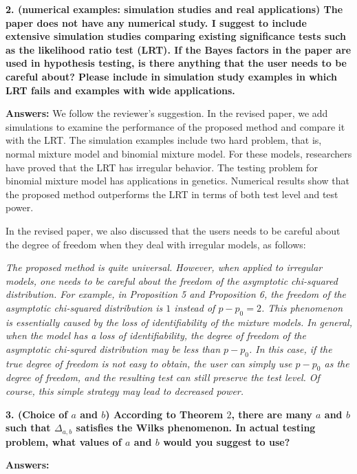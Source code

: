 \documentclass[11pt]{article}
\theoremstyle{plain}
\theoremstyle{definition}
\theoremstyle{remark}
\begin{document}
\textbf{
    2.
    (numerical examples: simulation studies and real applications) The paper does not have any numerical study. I suggest to include extensive simulation studies comparing existing significance tests such as the likelihood ratio test (LRT). If the Bayes factors in the paper are used in hypothesis testing, is there anything that the user needs to be careful about? Please include in simulation study examples in which LRT fails and examples with wide applications.
}

\textbf{Answers:}
We follow the reviewer's suggestion.
In the revised paper, we add simulations to examine the performance of the proposed method and compare it with the LRT.
The simulation examples include two hard problem, that is, normal mixture model and binomial mixture model.
For these models, researchers have proved that the LRT has irregular behavior.
The testing problem for binomial mixture model has applications in genetics.
Numerical results show that the proposed method outperforms the LRT in terms of both test level and test power.

In the revised paper, we also discussed that the users needs to be careful about the degree of freedom when they deal with irregular models, as follows:

\begin{adjustwidth}{1.5em}{1.5em}
    \emph{
The proposed method is quite universal. 
However, when applied to irregular models, one needs to be careful about the freedom of the asymptotic chi-squared distribution.
For example, in Proposition 5 and Proposition 6, the freedom of the asymptotic chi-squared distribution is $1$ instead of $p-p_0 = 2$.
This phenomenon is essentially caused by the loss of identifiability of the mixture models.
In general, when the model has a loss of identifiability, the degree of freedom of the asymptotic chi-squred distribution may be less than $p-p_0$.
In this case, if the true degree of freedom is not easy to obtain, the user can simply use $p-p_0$ as the degree of freedom, and the resulting test can still preserve the test level.
Of course, this simple strategy may lead to decreased power.
}
\end{adjustwidth}


\textbf{
    3. (Choice of $a$ and $b$) According to Theorem $2$, there are many $a$ and $b$ such that $\Delta_{a,b}$ satisfies the Wilks phenomenon.
    In actual testing problem, what values of $a$ and $b$ would you suggest to use?
}

\textbf{Answers:}
\end{document}
